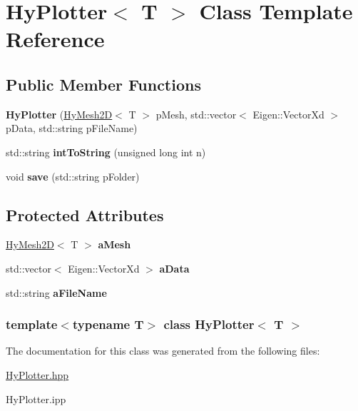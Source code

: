 \hypertarget{classHyPlotter}{
\section{HyPlotter$<$ T $>$ Class Template Reference}
\label{classHyPlotter}
}
\subsection*{Public Member Functions}
\begin{DoxyCompactItemize}
\item 
\hypertarget{classHyPlotter_ace9cd6b9ea3082dc8e31f5b6461deb6b}{
{\bfseries HyPlotter} (\hyperlink{classHyMesh2D}{HyMesh2D}$<$ T $>$ pMesh, std::vector$<$ Eigen::VectorXd $>$ pData, std::string pFileName)}
\label{classHyPlotter_ace9cd6b9ea3082dc8e31f5b6461deb6b}

\item 
\hypertarget{classHyPlotter_a3901644f0e38b620ebe2c02b2198aa23}{
std::string {\bfseries intToString} (unsigned long int n)}
\label{classHyPlotter_a3901644f0e38b620ebe2c02b2198aa23}

\item 
\hypertarget{classHyPlotter_acb107c1c3cf44bb32b900c329830fdfd}{
void {\bfseries save} (std::string pFolder)}
\label{classHyPlotter_acb107c1c3cf44bb32b900c329830fdfd}

\end{DoxyCompactItemize}
\subsection*{Protected Attributes}
\begin{DoxyCompactItemize}
\item 
\hypertarget{classHyPlotter_add8bc0e65fe86f1e8efb025afd679f70}{
\hyperlink{classHyMesh2D}{HyMesh2D}$<$ T $>$ {\bfseries aMesh}}
\label{classHyPlotter_add8bc0e65fe86f1e8efb025afd679f70}

\item 
\hypertarget{classHyPlotter_a9aa282a34786a8d215a28b43816a2e6c}{
std::vector$<$ Eigen::VectorXd $>$ {\bfseries aData}}
\label{classHyPlotter_a9aa282a34786a8d215a28b43816a2e6c}

\item 
\hypertarget{classHyPlotter_a7ff236b2b02b1ee33554d0c2d483ca83}{
std::string {\bfseries aFileName}}
\label{classHyPlotter_a7ff236b2b02b1ee33554d0c2d483ca83}

\end{DoxyCompactItemize}
\subsubsection*{template$<$typename T$>$ class HyPlotter$<$ T $>$}



The documentation for this class was generated from the following files:\begin{DoxyCompactItemize}
\item 
\hyperlink{HyPlotter_8hpp}{HyPlotter.hpp}\item 
HyPlotter.ipp\end{DoxyCompactItemize}
